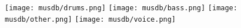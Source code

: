 \texttt{[image: musdb/drums.png]}
\texttt{[image: musdb/bass.png]}
\texttt{[image: musdb/other.png]}
\texttt{[image: musdb/voice.png]}
